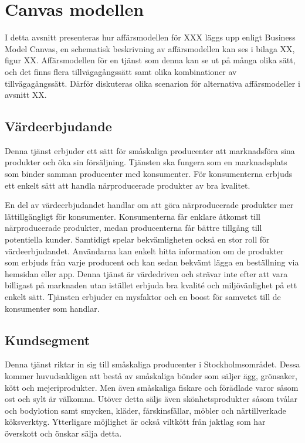 \documentclass[10pt,a4paper,oneside]{article}
\begin{document}
\newpage

\section{Canvas modellen}
I detta avsnitt presenteras hur affärsmodellen för XXX läggs upp enligt Business Model Canvas, en schematisk beskrivning av affärsmodellen kan ses i bilaga XX, figur XX. Affärsmodellen för en tjänst som denna kan se ut på många olika sätt, och det finns flera tillvägagångssätt samt olika kombinationer av tillvägagångssätt. Därför diskuteras olika scenarion för alternativa affärsmodeller i avsnitt XX. 

\subsection{Värdeerbjudande}
Denna tjänst erbjuder ett sätt för småskaliga producenter att marknadsföra sina produkter och öka sin försäljning. Tjänsten ska fungera som en marknadsplats som binder samman producenter med konsumenter. För konsumenterna erbjuds ett enkelt sätt att handla närproducerade produkter av bra kvalitet. 

En del av värdeerbjudandet handlar om att göra närproducerade produkter mer lättillgängligt för konsumenter. Konsumenterna får enklare åtkomst till närproducerade produkter, medan producenterna får bättre tillgång till potentiella kunder. Samtidigt spelar bekvämligheten också en stor roll för värdeerbjudandet. Användarna kan enkelt hitta information om de produkter som erbjuds från varje producent och kan sedan bekvämt lägga en beställning via hemsidan eller app. Denna tjänst är värdedriven och strävar inte efter att vara billigast på marknaden utan istället erbjuda bra kvalité och miljövänlighet på ett enkelt sätt. Tjänsten erbjuder en mysfaktor och en boost för samvetet till de konsumenter som handlar.   


\subsection{Kundsegment}
Denna tjänst riktar in sig till småskaliga producenter i Stockholmsområdet. Dessa kommer huvudsakligen att bestå av småskaliga bönder som säljer ägg, grönsaker, kött och mejeriprodukter. Men även småskaliga fiskare och förädlade varor såsom ost och sylt är välkomna. Utöver detta säljs även skönhetsprodukter såsom tvålar och bodylotion samt smycken, kläder, fårskinsfällar, möbler och närtillverkade köksverktyg. Ytterligare möjlighet är också viltkött från jaktlag som har överskott och önskar sälja detta. 
\end{document}
